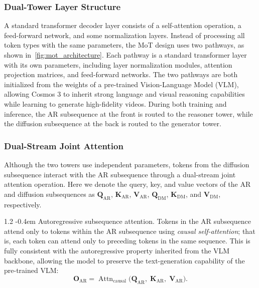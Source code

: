 \documentclass{llmxive}
\makeatletter
\providecommand{\paragraph}{  \@startsection{paragraph}{4}{\z@}    {1\baselineskip \@plus .2\baselineskip}    {-0.4em}    {\normalfont\normalsize\bfseries}}
\makeatother
\begin{document}
\subsubsection{Dual-Tower Layer Structure}
\label{sec:cosmos3_mot}

A standard transformer decoder layer consists of a self-attention operation, a feed-forward network, and some normalization layers. Instead of processing all token types with the same parameters, the MoT design uses two pathways, as shown in~\cref{fig:mot_architecture}. Each pathway is a standard transformer layer with its own parameters, including layer normalization modules, attention projection matrices, and feed-forward networks. The two pathways are both initialized from the weights of a pre-trained Vision-Language Model (VLM), allowing Cosmos 3 to inherit strong language and visual reasoning capabilities while learning to generate high-fidelity videos. During both training and inference, the AR subsequence at the front is routed to the reasoner tower, while the diffusion subsequence at the back is routed to the generator tower.

\subsubsection{Dual-Stream Joint Attention}
Although the two towers use independent parameters, tokens from the diffusion subsequence interact with the AR subsequence through a dual-stream joint attention operation. Here we denote the query, key, and value vectors of the AR and diffusion subsequences as $\mathbf{Q}_\text{AR}$, $\mathbf{K}_\text{AR}$, $\mathbf{V}_\text{AR}$, $\mathbf{Q}_\text{DM}$, $\mathbf{K}_\text{DM}$, and $\mathbf{V}_\text{DM}$, respectively.

\paragraph{Autoregressive subsequence attention.}
Tokens in the AR subsequence attend only to tokens within the AR subsequence using \emph{causal self-attention}; that is, each token can attend only to preceding tokens in the same sequence. This is fully consistent with the autoregressive property inherited from the VLM backbone, allowing the model to preserve the text-generation capability of the pre-trained VLM:
\begin{equation}
    \mathbf{O}_\text{AR} = \operatorname{Attn}_\text{causal}\!\bigl(
        \mathbf{Q}_\text{AR},\; \mathbf{K}_\text{AR},\; \mathbf{V}_\text{AR}
    \bigr).
    \label{eq::ar_attn}
\end{equation}
\end{document}
